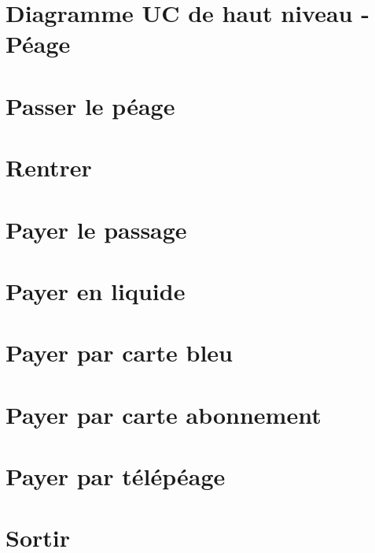 \label{Cap:TD2}

\section{Diagramme UC de haut niveau - Péage}
    

\newpage
\section{Passer le péage}\label{sec:passer}
    

\newpage

\section{Rentrer} \label{subsec:rentre}
    

\newpage

\section{Payer le passage} \label{subsec:paie}
    
 
 \newpage   
\section{Payer en liquide} \label{subsec:paieLiquide}
    
    
\newpage
\section{Payer par carte bleu} \label{subsec:paierBleu}
    
\newpage

\section{Payer par carte abonnement} \label{subsec:paierAbonement}
    
    
\newpage  
\section{Payer par télépéage} \label{subsec:paierTelepeage}
    

\newpage    
\section{Sortir} \label{subsec:sortir}
    

\newpage